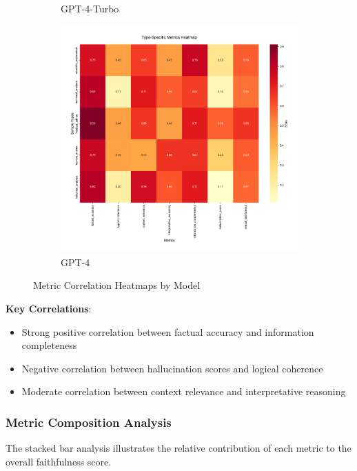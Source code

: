 \begin{figure}[!htbp]
\begin{subfigure}[b]{0.32\textwidth}
    \caption{GPT-4-Turbo}
    \label{fig:metrics_heatmap_gpt4t}
\end{subfigure}
\hfill
\begin{subfigure}[b]{0.32\textwidth}
    \includegraphics[width=\textwidth]{figures/visualization/metrics_heatmap_gpt-4.png}
    \caption{GPT-4}
    \label{fig:metrics_heatmap_gpt4}
\end{subfigure}
\caption{Metric Correlation Heatmaps by Model}
\label{fig:metrics_heatmaps}
\end{figure}

\textbf{Key Correlations}:
\begin{itemize}
    \item Strong positive correlation between factual accuracy and information completeness
    \item Negative correlation between hallucination scores and logical coherence
    \item Moderate correlation between context relevance and interpretative reasoning
\end{itemize}

\subsubsection{Metric Composition Analysis}
The stacked bar analysis illustrates the relative contribution of each metric to the overall faithfulness score.

